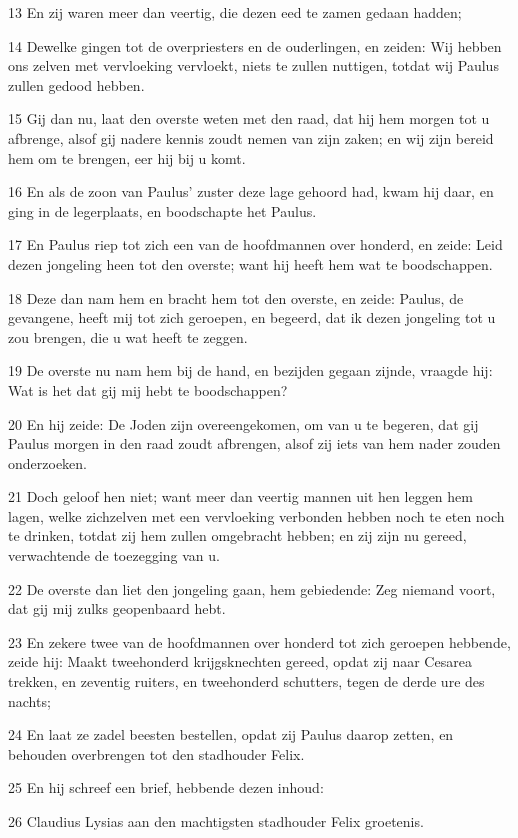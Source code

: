 \par 13 En zij waren meer dan veertig, die dezen eed te zamen gedaan hadden;
\par 14 Dewelke gingen tot de overpriesters en de ouderlingen, en zeiden: Wij hebben ons zelven met vervloeking vervloekt, niets te zullen nuttigen, totdat wij Paulus zullen gedood hebben.
\par 15 Gij dan nu, laat den overste weten met den raad, dat hij hem morgen tot u afbrenge, alsof gij nadere kennis zoudt nemen van zijn zaken; en wij zijn bereid hem om te brengen, eer hij bij u komt.
\par 16 En als de zoon van Paulus' zuster deze lage gehoord had, kwam hij daar, en ging in de legerplaats, en boodschapte het Paulus.
\par 17 En Paulus riep tot zich een van de hoofdmannen over honderd, en zeide: Leid dezen jongeling heen tot den overste; want hij heeft hem wat te boodschappen.
\par 18 Deze dan nam hem en bracht hem tot den overste, en zeide: Paulus, de gevangene, heeft mij tot zich geroepen, en begeerd, dat ik dezen jongeling tot u zou brengen, die u wat heeft te zeggen.
\par 19 De overste nu nam hem bij de hand, en bezijden gegaan zijnde, vraagde hij: Wat is het dat gij mij hebt te boodschappen?
\par 20 En hij zeide: De Joden zijn overeengekomen, om van u te begeren, dat gij Paulus morgen in den raad zoudt afbrengen, alsof zij iets van hem nader zouden onderzoeken.
\par 21 Doch geloof hen niet; want meer dan veertig mannen uit hen leggen hem lagen, welke zichzelven met een vervloeking verbonden hebben noch te eten noch te drinken, totdat zij hem zullen omgebracht hebben; en zij zijn nu gereed, verwachtende de toezegging van u.
\par 22 De overste dan liet den jongeling gaan, hem gebiedende: Zeg niemand voort, dat gij mij zulks geopenbaard hebt.
\par 23 En zekere twee van de hoofdmannen over honderd tot zich geroepen hebbende, zeide hij: Maakt tweehonderd krijgsknechten gereed, opdat zij naar Cesarea trekken, en zeventig ruiters, en tweehonderd schutters, tegen de derde ure des nachts;
\par 24 En laat ze zadel beesten bestellen, opdat zij Paulus daarop zetten, en behouden overbrengen tot den stadhouder Felix.
\par 25 En hij schreef een brief, hebbende dezen inhoud:
\par 26 Claudius Lysias aan den machtigsten stadhouder Felix groetenis.
